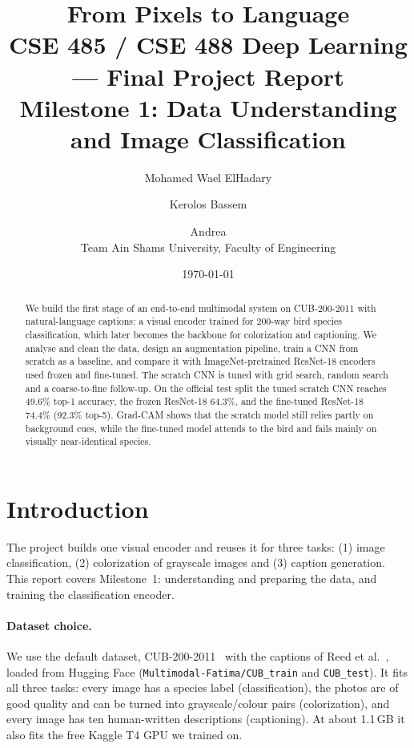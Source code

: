 \documentclass[11pt,a4paper]{article}
\title{\textbf{From Pixels to Language}\\[4pt]
\large CSE 485 / CSE 488 Deep Learning --- Final Project Report\\
Milestone 1: Data Understanding and Image Classification}
\author{Mohamed Wael ElHadary \and Kerolos Bassem \and Andrea\\[4pt]
\small Team \todo{team number} \quad
\small Ain Shams University, Faculty of Engineering}
\date{\today}
\begin{document}
\maketitle

\begin{abstract}
We build the first stage of an end-to-end multimodal system on CUB-200-2011
with natural-language captions: a visual encoder trained for 200-way bird
species classification, which later becomes the backbone for colorization and
captioning. We analyse and clean the data, design an augmentation pipeline,
train a CNN from scratch as a baseline, and compare it with ImageNet-pretrained
ResNet-18 encoders used frozen and fine-tuned. The scratch CNN is tuned with
grid search, random search and a coarse-to-fine follow-up. On the official test
split the tuned scratch CNN reaches 49.6\% top-1 accuracy, the frozen ResNet-18
64.3\%, and the fine-tuned ResNet-18 74.4\% (92.3\% top-5). Grad-CAM shows that
the scratch model still relies partly on background cues, while the fine-tuned
model attends to the bird and fails mainly on visually near-identical species.
\end{abstract}

\tableofcontents
\newpage

\section{Introduction}

The project builds one visual encoder and reuses it for three tasks:
(1) image classification, (2) colorization of grayscale images and
(3) caption generation. This report covers Milestone~1: understanding and
preparing the data, and training the classification encoder.

\paragraph{Dataset choice.} We use the default dataset, CUB-200-2011~\cite{wah2011}
with the captions of Reed et al.~\cite{reed2016}, loaded from Hugging Face
(\texttt{Multimodal-Fatima/CUB\_train} and \texttt{CUB\_test}). It fits all
three tasks: every image has a species label (classification), the photos are
of good quality and can be turned into grayscale/colour pairs (colorization),
and every image has ten human-written descriptions (captioning). At about
1.1\,GB it also fits the free Kaggle T4 GPU we trained on.
\end{document}
